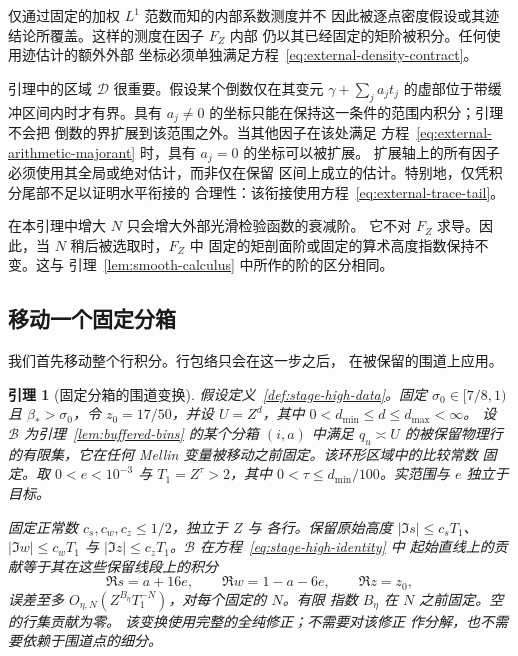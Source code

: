 \documentclass[11pt,a4paper]{article}
\numberwithin{equation}{section}
\numberwithin{figure}{section}
\newtheorem{lemma}[theorem]{引理}
\theoremstyle{definition}
\theoremstyle{remark}
\begin{document}
仅通过固定的加权 $L^1$ 范数而知的内部系数测度并不
因此被逐点密度假设或其迹结论所覆盖。这样的测度在因子 $F_Z$ 内部
仍以其已经固定的矩阶被积分。任何使用迹估计的额外外部
坐标必须单独满足方程~\eqref{eq:external-density-contract}。

引理中的区域 $\mathcal D$ 很重要。假设某个倒数仅在其变元
$\gamma+\sum_j a_jt_j$ 的虚部位于带缓冲区间内时才有界。具有
$a_j\ne0$ 的坐标只能在保持这一条件的范围内积分；引理不会把
倒数的界扩展到该范围之外。当其他因子在该处满足
方程~\eqref{eq:external-arithmetic-majorant} 时，具有 $a_j=0$ 的坐标可以被扩展。
扩展轴上的所有因子必须使用其全局或绝对估计，而非仅在保留
区间上成立的估计。特别地，仅凭积分尾部不足以证明水平衔接的
合理性：该衔接使用方程~\eqref{eq:external-trace-tail}。

在本引理中增大 $N$ 只会增大外部光滑检验函数的衰减阶。
它不对 $F_Z$ 求导。因此，当 $N$ 稍后被选取时，$F_Z$ 中
固定的矩剖面阶或固定的算术高度指数保持不变。这与
引理~\ref{lem:smooth-calculus} 中所作的阶的区分相同。

\subsection{移动一个固定分箱}

我们首先移动整个行积分。行包络只会在这一步之后，
在被保留的围道上应用。

\begin{lemma}[固定分箱的围道变换]
\label{lem:fixed-bin-contour}
假设定义~\ref{def:stage-high-data}。固定
$\sigma_0\in[7/8,1)$ 且 $\beta_*>\sigma_0$，令 $z_0=17/50$，并设
$U=Z^d$，其中 $0<d_{\min}\le d\le d_{\max}<\infty$。
设 $\mathcal B$ 为引理~\ref{lem:buffered-bins} 的某个分箱 $(i,a)$ 中满足 $q_u\asymp U$
的被保留物理行的有限集，它在任何
Mellin 变量被移动之前固定。该环形区域中的比较常数
固定。取 $0<e<10^{-3}$ 与 $T_1=Z^\tau>2$，其中
$0<\tau\le d_{\min}/100$。实范围与 $e$ 独立于
目标。

固定正常数 $c_s,c_w,c_z\le1/2$，独立于 $Z$ 与
各行。保留原始高度
$|\Im s|\le c_sT_1$、$|\Im w|\le c_wT_1$ 与
$|\Im z|\le c_zT_1$。$\mathcal B$ 在方程~\eqref{eq:stage-high-identity} 中
起始直线上的贡献等于其在这些保留线段上的积分
\begin{equation}
 \Re s=a+16e,\qquad \Re w=1-a-6e,\qquad \Re z=z_0,
 \label{eq:stage-central-contours}
\end{equation}
误差至多 $O_{\eta,N}(Z^{B_\eta}T_1^{-N})$，对每个固定的 $N$。有限
指数 $B_\eta$ 在 $N$ 之前固定。空的行集贡献为零。
该变换使用完整的全纯修正；不需要对该修正
作分解，也不需要依赖于围道点的细分。
\end{lemma}
\end{document}

